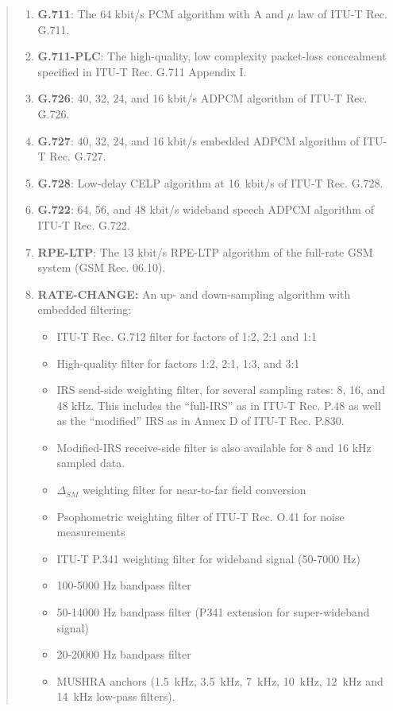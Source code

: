 \begin{quote}
\begin{enumerate}
\item {\bf G.711}: The 64 kbit/s PCM algorithm with A and $\mu$ law of ITU-T Rec. G.711.

\item {\bf G.711-PLC}: The high-quality, low complexity packet-loss concealment specified in ITU-T Rec. G.711 Appendix I.

\item {\bf G.726}: 40, 32, 24, and 16 kbit/s ADPCM algorithm of ITU-T Rec. G.726.

\item {\bf G.727}: 40, 32, 24, and 16 kbit/s embedded ADPCM algorithm of ITU-T Rec. G.727.
 
\item {\bf G.728}: Low-delay CELP algorithm at 16~kbit/s of ITU-T Rec. G.728.

\item {\bf G.722}: 64, 56, and 48 kbit/s wideband speech ADPCM algorithm of ITU-T Rec. G.722.

\item {\bf RPE-LTP}: The 13 kbit/s RPE-LTP algorithm of the full-rate GSM system (GSM Rec. 06.10).
        
\item {\bf RATE-CHANGE:} An up- and down-sampling algorithm with embedded filtering:
  \begin{itemize}
  \item ITU-T Rec. G.712 filter for factors of 1:2, 2:1 and 1:1
  \item High-quality filter for factors 1:2, 2:1, 1:3, and 3:1
  \item IRS send-side weighting filter, for several sampling rates: 8, 16, and 48 kHz. This includes the ``full-IRS'' as in ITU-T Rec. P.48 as well as the ``modified'' IRS as in Annex D of ITU-T Rec. P.830.
  \item Modified-IRS receive-side filter is also available for 8 and 16 kHz sampled data.
  \item $\Delta_{SM}$ weighting filter for near-to-far field conversion
  \item Psophometric weighting filter of ITU-T Rec. O.41 for noise measurements
  \item ITU-T P.341 weighting filter for wideband signal (50-7000 Hz)
  \item  100-5000 Hz bandpass filter
  \item  50-14000 Hz bandpass filter (P341 extension for super-wideband signal)
  \item  20-20000 Hz bandpass filter
  \item MUSHRA anchors (1.5~kHz, 3.5~kHz, 7~kHz, 10~kHz, 12~kHz and 14~kHz low-pass filters).
  \end{itemize}


\end{enumerate}
\end{quote}

